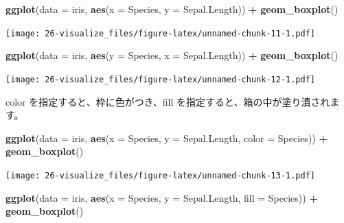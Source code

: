 \documentclass[
  xelatex, ja=standard]{bxjsbook}
\newenvironment{Shaded}{\begin{snugshade}}{\end{snugshade}}
\newcommand{\AttributeTok}[1]{\textcolor[rgb]{0.13,0.29,0.53}{#1}}
\newcommand{\FunctionTok}[1]{\textcolor[rgb]{0.13,0.29,0.53}{\textbf{#1}}}
\newcommand{\NormalTok}[1]{#1}
\newcommand{\SpecialCharTok}[1]{\textcolor[rgb]{0.81,0.36,0.00}{\textbf{#1}}}
\theoremstyle{definition}
\theoremstyle{definition}
\theoremstyle{definition}
\theoremstyle{definition}
\theoremstyle{remark}
\begin{document}
\begin{Shaded}
\begin{Highlighting}[]
\FunctionTok{ggplot}\NormalTok{(}\AttributeTok{data =}\NormalTok{ iris, }\FunctionTok{aes}\NormalTok{(}\AttributeTok{x =}\NormalTok{ Species, }\AttributeTok{y =}\NormalTok{ Sepal.Length)) }\SpecialCharTok{+}
  \FunctionTok{geom\_boxplot}\NormalTok{()}
\end{Highlighting}
\end{Shaded}

\texttt{[image: 26-visualize\_files/figure-latex/unnamed-chunk-11-1.pdf]}

\begin{Shaded}
\begin{Highlighting}[]
\FunctionTok{ggplot}\NormalTok{(}\AttributeTok{data =}\NormalTok{ iris, }\FunctionTok{aes}\NormalTok{(}\AttributeTok{y =}\NormalTok{ Species, }\AttributeTok{x =}\NormalTok{ Sepal.Length)) }\SpecialCharTok{+}
  \FunctionTok{geom\_boxplot}\NormalTok{()}
\end{Highlighting}
\end{Shaded}

\texttt{[image: 26-visualize\_files/figure-latex/unnamed-chunk-12-1.pdf]}

color を指定すると、枠に色がつき、fill を指定すると、箱の中が塗り潰されます。

\begin{Shaded}
\begin{Highlighting}[]
\FunctionTok{ggplot}\NormalTok{(}\AttributeTok{data =}\NormalTok{ iris, }\FunctionTok{aes}\NormalTok{(}\AttributeTok{x =}\NormalTok{ Species, }\AttributeTok{y =}\NormalTok{ Sepal.Length, }\AttributeTok{color =}\NormalTok{ Species)) }\SpecialCharTok{+}
  \FunctionTok{geom\_boxplot}\NormalTok{()}
\end{Highlighting}
\end{Shaded}

\texttt{[image: 26-visualize\_files/figure-latex/unnamed-chunk-13-1.pdf]}

\begin{Shaded}
\begin{Highlighting}[]
\FunctionTok{ggplot}\NormalTok{(}\AttributeTok{data =}\NormalTok{ iris, }\FunctionTok{aes}\NormalTok{(}\AttributeTok{x =}\NormalTok{ Species, }\AttributeTok{y =}\NormalTok{ Sepal.Length, }\AttributeTok{fill =}\NormalTok{ Species)) }\SpecialCharTok{+}
  \FunctionTok{geom\_boxplot}\NormalTok{()}
\end{Highlighting}
\end{Shaded}
\end{document}
